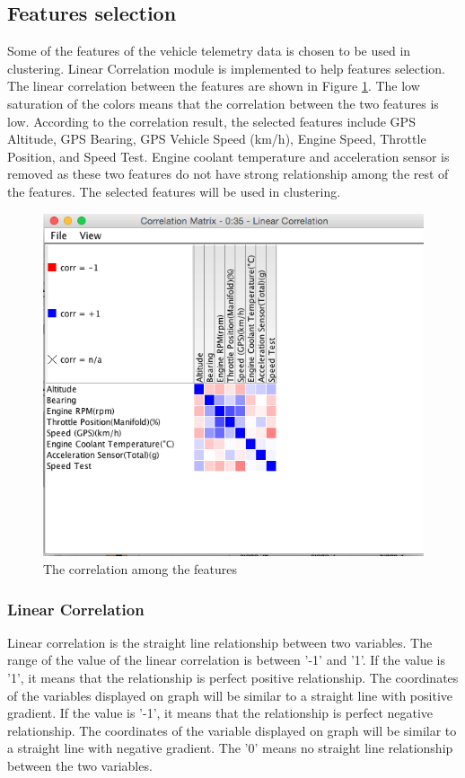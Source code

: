 \subsection{Features selection}
Some of the features of the vehicle telemetry data is chosen to be used in clustering. Linear Correlation module is implemented to help features selection. The linear correlation between the features are shown in Figure \ref{fig:correlation}. The low saturation of the colors means that the correlation between the two features is low. According to the correlation result, the selected features include GPS Altitude, GPS Bearing, GPS Vehicle Speed (km/h), Engine Speed, Throttle Position, and Speed Test. Engine coolant temperature and acceleration sensor is removed as these two features do not have strong relationship among the rest of the features. The selected features will be used in clustering.

\begin{figure}[hbt!]\centering
\includegraphics[height=.5\textwidth]{image/KNIMEcorrelation}
\caption{The correlation among the features}
\label{fig:correlation}
\end{figure}

\subsubsection{Linear Correlation}
Linear correlation is the straight line relationship between two variables. The range of the value of the linear correlation is between '-1' and '1'. If the value is '1', it means that the relationship is perfect positive relationship. The coordinates of the variables displayed on graph will be similar to a straight line with positive gradient. If the value is '-1', it means that the relationship is perfect negative relationship. The coordinates of the variable displayed on graph will be similar to a straight line with negative gradient. The '0' means no straight line relationship between the two variables.

